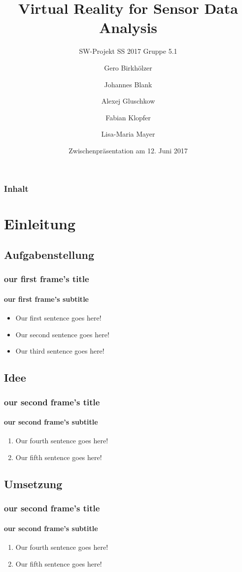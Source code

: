\documentclass{beamer}
\title{Virtual Reality for Sensor Data Analysis}
\subtitle{SW-Projekt SS 2017 Gruppe 5.1}
\author{Gero Birkh\"olzer \and Johannes Blank \and Alexej Gluschkow \\ \and Fabian Klopfer \and Lisa-Maria Mayer}
\date{Zwischenpr\"asentation am 12. Juni 2017}
\begin{document}
\frame{\titlepage} 

\begin{frame}
  \frametitle{Inhalt}
  \tableofcontents%
\end{frame}


\section{Einleitung}

\subsection{Aufgabenstellung}

\begin{frame}
\frametitle{our first frame's title}
\framesubtitle{our first frame's subtitle}
\begin{itemize}
	\item Our first sentence goes here!
	\item Our second sentence goes here!
	\item Our third sentence goes here!
\end{itemize}
\end{frame}

\subsection{Idee} %

\begin{frame}
\frametitle{our second frame's title}
\framesubtitle{our second frame's subtitle}
\begin{enumerate}
	\item Our fourth sentence goes here!
	\item Our fifth sentence goes here!
\end{enumerate}
\end{frame}

\subsection{Umsetzung} %

\begin{frame}
\frametitle{our second frame's title}
\framesubtitle{our second frame's subtitle}
\begin{enumerate}
	\item Our fourth sentence goes here!
	\item Our fifth sentence goes here!
\end{enumerate}
\end{frame}
\end{document}
